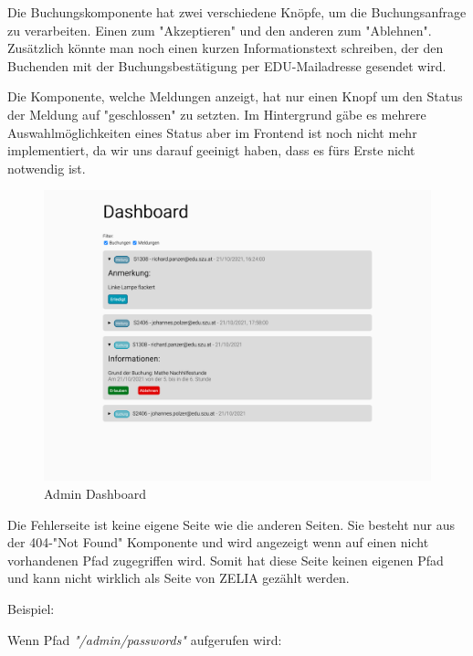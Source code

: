 Die Buchungskomponente hat zwei verschiedene Knöpfe, um die Buchungsanfrage zu verarbeiten. Einen zum "Akzeptieren" und den anderen zum "Ablehnen". Zusätzlich könnte man noch einen kurzen Informationstext schreiben, der den Buchenden mit der Buchungsbestätigung per EDU-Mailadresse gesendet wird. 

Die Komponente, welche Meldungen anzeigt, hat nur einen Knopf um den Status der Meldung auf "geschlossen" zu setzten. Im Hintergrund gäbe es mehrere Auswahlmöglichkeiten eines Status aber im Frontend ist noch nicht mehr implementiert, da wir uns darauf geeinigt haben, dass es fürs Erste nicht notwendig ist.

\begin{figure}[H]
    \centering
    \includegraphics[width=120mm]{media/WebComponents/AdminSeite_light.png}
    \caption{Admin Dashboard}
\end{figure}


Die Fehlerseite ist keine eigene Seite wie die anderen Seiten. Sie besteht nur aus der 404-"Not Found" Komponente und wird angezeigt wenn auf einen nicht vorhandenen Pfad zugegriffen wird. Somit hat diese Seite keinen eigenen Pfad und kann nicht wirklich als Seite von ZELIA gezählt werden.

Beispiel: 

Wenn Pfad \emph{"/admin/passwords"} aufgerufen wird:

